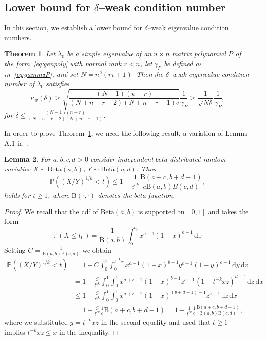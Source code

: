 \documentclass[12pt]{article}
\newcommand{\Bdist}{\mathrm{Beta}}
\newcommand{\Bfun}{\mathrm{B}}
\newcommand{\dx}{\,\mathrm{d}x}
\newcommand{\dy}{\,\mathrm{d}y}
\newcommand{\dz}{\,\mathrm{d}z}
\newtheorem{theorem}{Theorem}[section]
\newtheorem{lemma}[theorem]{Lemma}
\begin{document}
\subsection{Lower bound for $\delta$--weak condition number}

In this section, we establish a lower bound for $\delta$--weak eigenvalue condition numbers.
\begin{theorem}\label{t:deltaWeakCondLowerBound}
Let $\lambda_0$ be a simple eigenvalue of an $n\times n$ matrix polynomial $P$ of the form~\eqref{eq:genpoly} with normal rank $r<n$, let $\gamma_P$ be defined as in~\eqref{eq:gammaP}, and set $N = n^2(m+1)$. Then the $\delta$--weak eigenvalue condition number of $\lambda_0$ satisfies
\begin{equation}\label{eq:deltaWeakCondLowerBound}
    \kappa_w(\delta) \geq \sqrt{\frac{(N-1)(n-r)}{(N+n-r-2)(N+n-r-1)\delta}}\frac{1}{\gamma_P} \ge \frac{1}{\sqrt{N\delta}} \frac{1}{\gamma_P},
\end{equation}
for $\delta \leq \frac{(N-1)(n-r)}{(N+n-r-2)(N+n-r-1)}$.
\end{theorem}
In order to prove Theorem~\ref{t:deltaWeakCondLowerBound}, we need the following result, a variation of Lemma A.1 in~\cite{lotz2020wilkinson}.
\begin{lemma}\label{l:TailBound}
For $a,b,c,d>0$ consider independent beta-distributed random variables $X\sim \Bdist(a,b)$, $Y\sim \Bdist(c,d)$. Then
\[
    \mathbb{P}((X/Y)^{1/k}<t)\leq 1-\frac{1}{t^{ck}} \frac{\Bfun(a+c,b+d-1)}{c \Bfun(a,b)B(c,d)},
\]
holds for $t\geq 1$, where $\Bfun(\cdot,\cdot)$ denotes the beta function.
\end{lemma}
\begin{proof}
We recall that the cdf of $\Bdist(a,b)$ is supported on $[0,1]$ and takes the form
\[
 \mathbb{P}(X \le t_0)= \frac{1}{\Bfun(a,b)} \int_0^{t_0} x^{a-1} (1-x)^{b-1}  \dx
\]
Setting $C = \frac{1}{\Bfun(a,b)\Bfun(c,d)}$ we obtain
\begin{align*}
    \mathbb{P}((X/Y)^{1/k}<t) &= 1-C\int^1_0\int^{t^{-k}x}_{0} x^{a-1}(1-x)^{b-1}y^{c-1}(1-y)^{d-1}\dy\dx \\
    & = 1 - \frac{C}{t^{ck}}\int^1_0\int^{1}_0x^{a+c-1}(1-x)^{b-1}z^{c-1}(1-t^{-k}xz)^{d-1}\dz\dx\\
    &\leq 1-\frac{C}{t^{ck}}\int^1_0\int^1_{0}x^{a+c-1}(1-x)^{(b+d-1)-1}z^{c-1}\dz\dx \\
    &= 1-\frac{C}{t^{ck}}\frac{1}{c}\Bfun(a+c,b+d-1) = 1-\frac{1}{t^{ck}}\frac{1}{c}\frac{\Bfun(a+c,b+d-1)}{\Bfun(a,b)\Bfun(c,d)},
\end{align*}
where we substituted $y = t^{-k}x z$ in the second equality
and used that $t\geq 1$ implies $t^{-k}xz\leq x$ in the inequality.
\end{proof}
\end{document}
